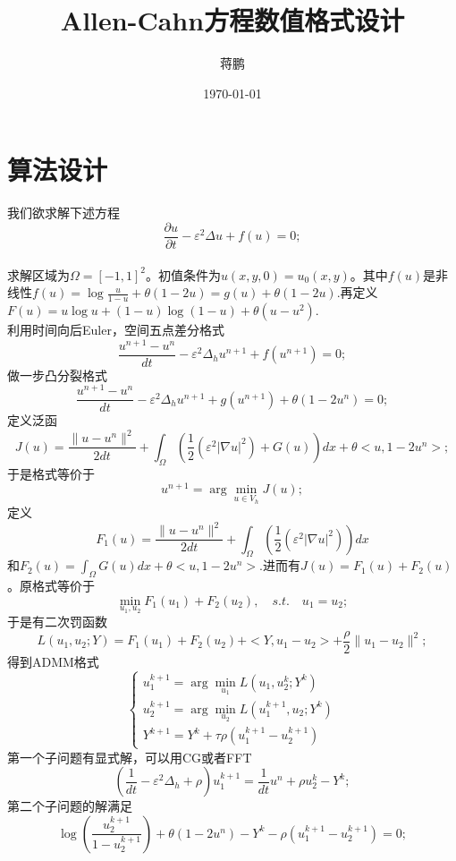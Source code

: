 \documentclass[11pt,a4 paper,one side]{article}
\title{Allen-Cahn方程数值格式设计}
\date{\today}
\author{蒋鹏}
\begin{document}
\maketitle
\tableofcontents
\section{算法设计}
我们欲求解下述方程\begin{equation}
    \frac{\partial u}{\partial t}- \varepsilon^2 \Delta u + f(u) = 0;
\end{equation}
\\ 求解区域为$\Omega = [-1,1]^2$。初值条件为$u(x,y,0) = u_0(x,y)$。其中$f(u)$是非线性$f(u) = \log{\frac{u}{1-u}}+\theta (1-2u)=g(u)+\theta (1-2u)$.再定义$F(u) = u\log{u}+(1-u)\log{(1-u)}+\theta (u-u^2)$.
\\利用时间向后Euler，空间五点差分格式 \begin{equation}
    \frac{u^{n+1}-u^n}{dt} - \varepsilon^2 \Delta_h u^{n+1} + f(u^{n+1})=0;
\end{equation}
做一步凸分裂格式\begin{equation}
    \frac{u^{n+1}-u^n}{dt} - \varepsilon^2 \Delta_h u^{n+1} + g(u^{n+1}) +\theta (1-2u^n)=0;
\end{equation}
定义泛函\begin{equation}
    J(u) = \frac{\|u-u^n\|^2}{2dt}+ \int_{\Omega} ( \frac{1}{2}(\varepsilon^2 |\nabla u|^2 ) + G(u) ) dx + \theta <u,1-2u^n>;
\end{equation}
于是格式等价于\begin{equation}
    u^{n+1} = \arg \min_{u \in V_h} J(u);
\end{equation}
定义\begin{equation}
    F_1(u) = \frac{\|u-u^n\|^2}{2dt} + \int_{\Omega} (\frac{1}{2}(\varepsilon^2 |\nabla u|^2 )) dx
\end{equation}
和$F_2(u) =  \int_{\Omega} G(u) dx + \theta <u,1-2u^n>$.进而有$J(u) = F_1(u)+F_2(u)$。原格式等价于\begin{equation}
    \min_{u_1,u_2} F_1(u_1) + F_2(u_2), \quad s.t. \quad u_1=u_2;
\end{equation}
于是有二次罚函数\begin{equation}
    L(u_1,u_2;Y) = F_1(u_1) + F_2(u_2) + <Y,u_1-u_2> + \frac{\rho}{2}\|u_1-u_2\|^2;
\end{equation}
得到ADMM格式\begin{equation}
    \begin{cases}
        u_1^{k+1} = \arg \min_{u_1} L(u_1,u_2^k;Y^k) \\
        u_2^{k+1} = \arg \min_{u_2} L(u_1^{k+1},u_2;Y^k) \\
        Y^{k+1} = Y^k + \tau \rho (u_1^{k+1}-u_2^{k+1})
    \end{cases}
\end{equation}
第一个子问题有显式解，可以用CG或者FFT\begin{equation}
    (\frac{1}{dt}-\varepsilon^2 \Delta_h + \rho)u_1^{k+1} = \frac{1}{dt}u^n + \rho u_2^k - Y^k;
\end{equation}
第二个子问题的解满足\begin{equation}
    \log (\frac{u_2^{k+1}}{1-u_2^{k+1}})+\theta (1-2u^n) - Y^k -\rho (u_1^{k+1}-u_2^{k+1})=0;
\end{equation}
\end{document}
